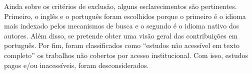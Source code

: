 
Ainda sobre os critérios de exclusão, alguns esclarecimentos são pertinentes. Primeiro, o inglês e o português foram escolhidos porque o primeiro é o idioma mais indexado pelos mecanismos de busca e o segundo é o idioma nativo dos autores. Além disso, se pretende obter uma visão geral das contribuições em português. Por fim, foram classificados como ``estudos não acessível em texto completo'' os trabalhos não cobertos por acesso institucional. Com isso, estudos pagos e/ou inacessíveis, foram desconsiderados.



